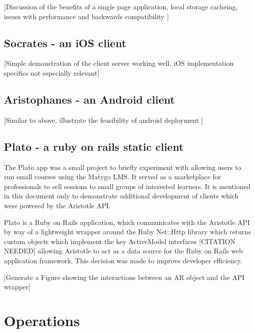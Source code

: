 \documentclass[a4paper,12pt,titlepage]{report}
\begin{document}
[Discussion of the benefits of a single page application, local storage cacheing, issues with performance and backwards compatibility ]


\subsection{Socrates - an iOS client} %
\label{sub:socrates}

[Simple demonstration of the client server working well, iOS implementation specifics not especially relevant]


\subsection{Aristophanes - an Android client} %
\label{sub:aristophanes}

[Similar to above, illustrate the feasibility of android deployment ]


\subsection{Plato - a ruby on rails static client} %
\label{sub:plato}

The Plato app was a small project to briefly experiment with allowing users to run small courses using the Matygo LMS. It served as a marketplace for professionals to sell sessions to small groups of interested learners. It is mentioned in this document only to demonstrate additional development of clients which were powered by the Aristotle API.

Plato is a Ruby on Rails application, which communicates with the Aristotle API by way of a lightweight wrapper around the Ruby Net::Http library which returns custom objects which implement the key ActiveModel interfaces [CITATION NEEDED] allowing Aristotle to act as a data source for the Ruby on Rails web application framework. This decision was made to improve developer efficiency. 

[Generate a Figure showing the interactions between an AR object and the API wrapper]


\section{Operations} %
\label{sec:operations}
\end{document}
